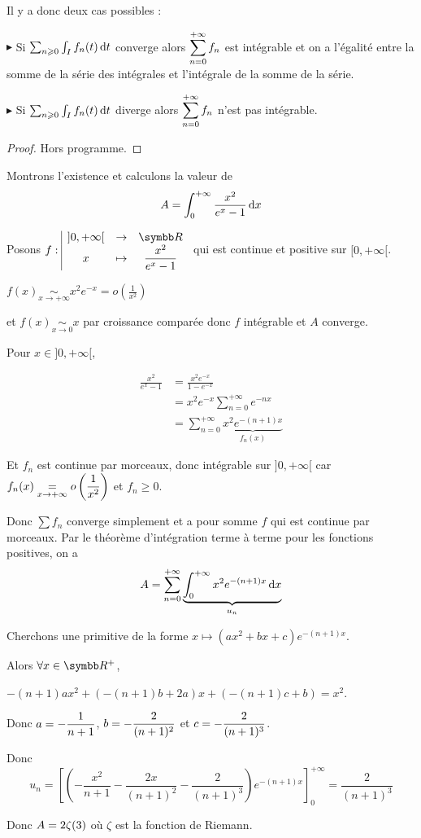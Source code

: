 Il y a donc deux cas possibles : 

$\blacktriangleright$ Si $\sum_{n \geqslant 0} \int_I f_n(t) \,\mathrm{d}t$ converge alors $\displaystyle \sum_{n = 0}^{+ \infty} f_n$ est intégrable 
et on a l'égalité entre la somme de la série des intégrales et l'intégrale de la somme de la série.

\avspace $\blacktriangleright$ Si $\sum_{n \geqslant 0} \int_I f_n(t) \,\mathrm{d}t$ diverge alors $\displaystyle \sum_{n = 0}^{+ \infty} f_n$ n'est pas intégrable.

\begin{proof}
    Hors programme. 
\end{proof}

\begin{exemple}
    Montrons l'existence et calculons la valeur de
    $$ A = \int_{0}^{+ \infty} \frac{x^2}{e^x - 1} \,\mathrm{d}x$$ 

    Posons $\fonction f {]0, + \infty[}{\R}{x}{\frac{x^2}{e^x - 1}}$ qui est continue et positive sur $[0, + \infty[$.

    $f(x) \underset{x \to + \infty}{\sim} x^2 e^{-x} = o\left( \frac 1 {x^2} \right)$ 
    
    et $f(x) \underset{x \to 0 }{\sim} x$ par croissance comparée donc $f$ intégrable et $A$ converge. 

    \avspace Pour $x \in ]0, + \infty[$, 
    
    \begin{align}
        \frac{x^2}{e^x - 1 } & = \frac{x^2 e^{-x}}{1 - e^{-x}} \\
        & = x^2 e^{-x} \sum_{n = 0}^{+ \infty} e^{-nx} \\
        & = \sum_{n = 0}^{+ \infty} \underbrace{x^2 e^{-(n + 1)x}}_{f_n(x)}
    \end{align}

    Et $f_n$ est continue par morceaux, donc intégrable sur $]0, + \infty[$ car \\
    $\displaystyle f_n(x) \underset{x \to + \infty}{=} o\left( \frac 1 {x^2} \right)$ et $f_n \geqslant 0$.

    Donc $\sum f_n$ converge simplement et a pour somme $f$ qui est continue par morceaux.
    Par le théorème d'intégration terme à terme pour les fonctions positives, on a
    $$A = \sum_{n = 0}^{+ \infty} \underbrace{\int_0^{+ \infty} x^2 e^{-(n + 1)x} \,\mathrm{d}x}_{u_n}$$

    Cherchons une primitive de la forme $x \mapsto (ax^2 + bx + c)e^{-(n + 1)x}$.

    Alors $\forall x \in \R^+$,

    $-(n+1)ax^2 + (-(n + 1)b + 2a)x + (-(n + 1)c + b) = x^2$.

    Donc $\displaystyle a = - \frac 1 {n + 1}$, $\displaystyle b = - \frac 2 {(n + 1)^2}$ et $\displaystyle c = - \frac 2 {(n + 1)^3}$.

    Donc 
    $$u_n = \left[ \left( - \frac{x^2}{n + 1} - \frac{2x}{(n + 1)^2} - \frac{2}{(n + 1)^3} \right) e^{-(n + 1)x} \right]_0^{+ \infty} = \frac{2}{(n + 1)^3}$$

    Donc $\displaystyle A = 2 \zeta(3)$ où $\zeta$ est la fonction de Riemann.
\end{exemple}

